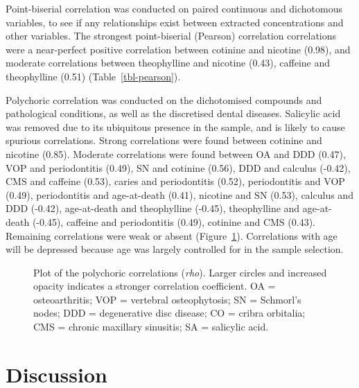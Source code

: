 \documentclass[
]{article}
\begin{document}
Point-biserial correlation was conducted on paired continuous and
dichotomous variables, to see if any relationships exist between
extracted concentrations and other variables. The strongest
point-biserial (Pearson) correlation correlations were a near-perfect
positive correlation between cotinine and nicotine (0.98), and moderate
correlations between theophylline and nicotine (0.43), caffeine and
theophylline (0.51) (Table~\ref{tbl-pearson}).

Polychoric correlation was conducted on the dichotomised compounds and
pathological conditions, as well as the discretised dental diseases.
Salicylic acid was removed due to its ubiquitous presence in the sample,
and is likely to cause spurious correlations. Strong correlations were
found between cotinine and nicotine (0.85). Moderate correlations were
found between OA and DDD (0.47), VOP and periodontitis (0.49), SN and
cotinine (0.56), DDD and calculus (-0.42), CMS and caffeine (0.53),
caries and periodontitis (0.52), periodontitis and VOP (0.49),
periodontitis and age-at-death (0.41), nicotine and SN (0.53), calculus
and DDD (-0.42), age-at-death and theophylline (-0.45), theophylline and
age-at-death (-0.45), caffeine and periodontitis (0.49), cotinine and
CMS (0.43). Remaining correlations were weak or absent
(Figure~\ref{fig-polycorr}). Correlations with age will be depressed
because age was largely controlled for in the sample selection.

\begin{figure}


\caption{\label{fig-polycorr}Plot of the polychoric correlations
(\emph{rho}). Larger circles and increased opacity indicates a stronger
correlation coefficient. OA = osteoarthritis; VOP = vertebral
osteophytosis; SN = Schmorl's nodes; DDD = degenerative disc disease; CO
= cribra orbitalia; CMS = chronic maxillary sinusitis; SA = salicylic
acid.}

\end{figure}%

\section{Discussion}\label{discussion}
\end{document}
